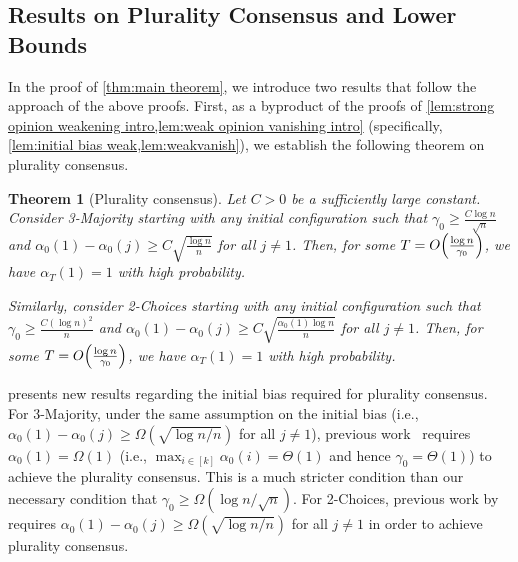 \documentclass[letterpaper,11pt]{article}
\newtheorem{theorem}{Theorem}[section]
\newcommand{\alphanorm}{\gamma}
\begin{document}
\subsection{Results on Plurality Consensus and Lower Bounds}\label{sec:plurality and lower}
In the proof of \cref{thm:main theorem}, we introduce two results that follow the approach of the above proofs.
First, as a byproduct of the proofs of \cref{lem:strong opinion weakening intro,lem:weak opinion vanishing intro} (specifically, \cref{lem:initial bias weak,lem:weakvanish}), we establish the following theorem on plurality consensus.
\begin{theorem}[Plurality consensus]\label{thm:plurality}
    Let $C>0$ be a sufficiently large constant.
    Consider 3-Majority starting with any initial configuration such that
    $\alphanorm_0\geq \frac{C\log n}{\sqrt{n}}$ and $\alpha_0(1)-\alpha_0(j)\geq C\sqrt{\frac{\log n}{n}}$ for all $j\neq 1$.
    Then, for some $T=O\qty(\frac{\log n}{\alphanorm_0})$, we have $\alpha_T(1)=1$ with high probability.

    Similarly, consider 2-Choices starting with any initial configuration such that $\alphanorm_0\geq \frac{C(\log n)^2}{n}$ and $\alpha_0(1)-\alpha_0(j)\geq C\sqrt{\frac{\alpha_0(1)\log n}{n}}$ for all $j\neq 1$.
    Then, for some $T=O\qty(\frac{\log n}{\alphanorm_0})$, we have $\alpha_T(1)=1$ with high probability.
\end{theorem}
%
 presents new results regarding the initial bias required for plurality consensus.
For 3-Majority, under the same assumption on the initial bias (i.e., $\alpha_0(1) - \alpha_0(j) \ge \Omega(\sqrt{\log n / n})$ for all $j \neq 1$), previous work~\cite{simple_dynamics} requires $\alpha_0(1) =\Omega(1)$ (i.e., $\max_{i\in [k]}\alpha_0(i) = \Theta(1)$ and hence $\alphanorm_0 = \Theta(1)$) to achieve the plurality consensus.
This is a much stricter condition than our necessary condition that $\alphanorm_0\geq \Omega(\log n/\sqrt{n})$.
For 2-Choices, previous work by \citet{plurality_2Choices}
requires $\alpha_0(1) - \alpha_0(j) \ge \Omega(\sqrt{\log n/n})$ for all $j \neq 1$ in order to achieve plurality consensus.
\end{document}
